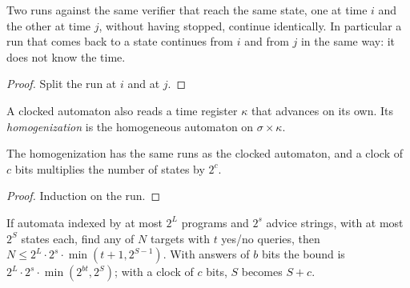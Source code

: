 \begin{theorem}
  \label{thm:noether-charge}
  \leanok
  Two runs against the same verifier that reach the same state, one at time $i$ and the other at
  time $j$, without having stopped, continue identically. In particular a run that comes back to a
  state continues from $i$ and from $j$ in the same way: it does not know the time.
  \own{}
\end{theorem}

\begin{proof}
  \leanok
  Split the run at $i$ and at $j$.
\end{proof}

\begin{definition}
  \label{def:clocked}
  \leanok
  A clocked automaton also reads a time register $\kappa$ that advances on its own. Its
  \emph{homogenization} is the homogeneous automaton on $\sigma \times \kappa$.
  \own{}
\end{definition}

\begin{theorem}
  \label{thm:homogenize}
  \leanok
  The homogenization has the same runs as the clocked automaton, and a clock of $c$ bits multiplies
  the number of states by $2^c$.
  \own{}
\end{theorem}

\begin{proof}
  \leanok
  Induction on the run.
\end{proof}

\begin{theorem}
  \label{thm:cube-law}
  \leanok
  If automata indexed by at most $2^L$ programs and $2^s$ advice strings, with at most $2^S$ states
  each, find any of $N$ targets with $t$ yes/no queries, then
  $N \le 2^L \cdot 2^s \cdot \min(t+1, 2^{S-1})$. With answers of $b$ bits the bound is
  $2^L \cdot 2^s \cdot \min(2^{bt}, 2^S)$; with a clock of $c$ bits, $S$ becomes $S + c$.
  \own{}
\end{theorem}

